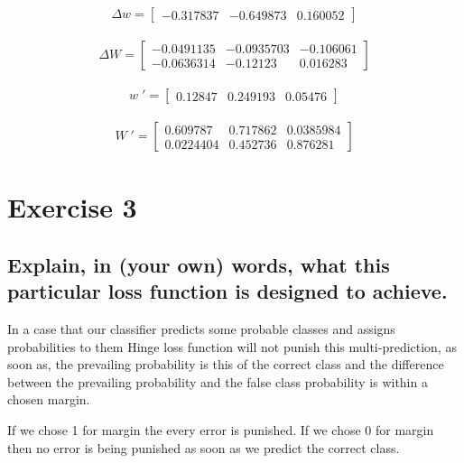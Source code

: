\documentclass[a4paper]{article}
\begin{document}
\begin{gather}\Delta w = \begin{bmatrix} -0.317837 & -0.649873 & 0.160052 \end{bmatrix}\nonumber \end{gather}

\begin{gather}
\Delta W =
\begin{bmatrix} -0.0491135 &	-0.0935703 &	-0.106061 \\ -0.0636314 &	-0.12123 &	0.016283 \end{bmatrix}
\nonumber \end{gather}

\begin{gather} w\;' = \begin{bmatrix} 0.12847 & 0.249193 & 0.05476 \end{bmatrix}\nonumber \end{gather}

\begin{gather}
W\;' =
\begin{bmatrix} 0.609787 & 0.717862 & 0.0385984 \\ 0.0224404 & 0.452736 &	0.876281\end{bmatrix}
\nonumber \end{gather}


\section{Exercise 3}

\subsection{Explain, in (your own) words, what this particular loss function is designed to achieve.}

In a case that our classifier predicts some probable classes and assigns probabilities to them Hinge loss function will not punish this multi-prediction, as soon as, the prevailing probability is this of the correct class and the difference between the prevailing probability and the false class probability is within a chosen margin.

If we chose 1 for margin the every error is punished. If we chose 0 for margin then no error is being punished as soon as we predict the correct class.
\end{document}
